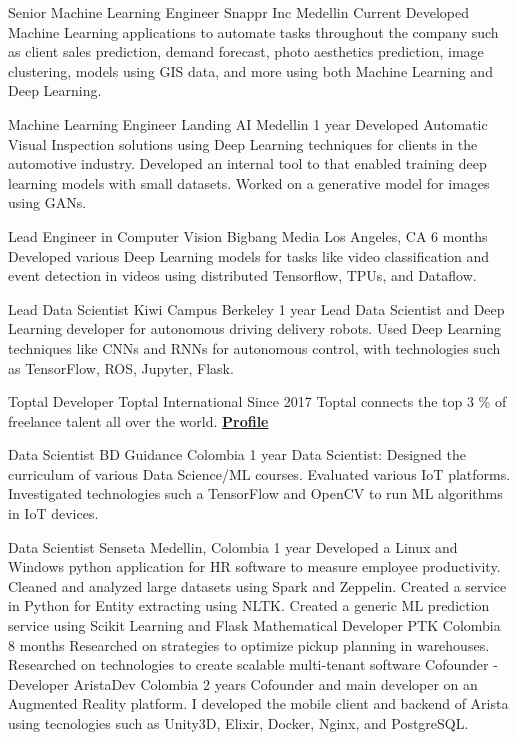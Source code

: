 \begin{cventries}

  \cventry
    {Senior Machine Learning Engineer}
    {Snappr Inc}
    {Medellin}
    {Current}
    {
    Developed Machine Learning applications to automate tasks throughout the company such as client sales prediction, demand forecast, photo aesthetics prediction, image clustering, models using GIS data, and more using both Machine Learning and Deep Learning.
    }

  \cventry
    {Machine Learning Engineer}
    {Landing AI}
    {Medellin}
    {1 year}
    {
    Developed Automatic Visual Inspection solutions using Deep Learning techniques for clients in the automotive industry. Developed an internal tool to that enabled training deep learning models with small datasets. Worked on a generative model for images using GANs.
    }

  \cventry
    {Lead Engineer in Computer Vision}
    {Bigbang Media}
    {Los Angeles, CA}
    {6 months}
    {
    Developed various Deep Learning models for tasks like video classification and event detection in videos using distributed Tensorflow, TPUs, and Dataflow.
    }
  
  \cventry
    {Lead Data Scientist}
    {Kiwi Campus}
    {Berkeley}
    {1 year}
    {
    Lead Data Scientist and Deep Learning developer for autonomous driving delivery robots. Used
    Deep Learning techniques like CNNs and RNNs for autonomous control,
    with technologies such as TensorFlow, ROS, Jupyter, Flask.
    }


  \cventry
    {Toptal Developer}
    {Toptal}
    {International}
    {Since 2017}
    {
      Toptal connects the top 3 \% of freelance talent all over the world. \href{https://www.toptal.com/resume/cristian-garcia}{\textbf{Profile}}
    }

  \cventry
    {Data Scientist}
    {BD Guidance}
    {Colombia}
    {1 year}
    {
    Data Scientist: Designed the curriculum of various
    Data Science/ML courses. Evaluated various IoT platforms. Investigated
    technologies such a TensorFlow and OpenCV to run ML algorithms in IoT
    devices.
    }

  \cventry
    {Data Scientist}
    {Senseta}
    {Medellin, Colombia}
    {1 year}
    {
    Developed a Linux and Windows python
    application for HR software to measure employee productivity. Cleaned
    and analyzed large datasets using Spark and Zeppelin. Created a service in
    Python for Entity extracting using NLTK. Created a generic ML prediction
    service using Scikit Learning and Flask
    }
  \cventry
    {Mathematical Developer}
    {PTK}
    {Colombia}
    {8 months}
    {
    Researched on strategies to optimize
    pickup planning in warehouses. Researched on technologies to create
    scalable multi-tenant software
    }
  \cventry
    {Cofounder - Developer}
    {AristaDev}
    {Colombia}
    {2 years}
    {
    Cofounder and main developer on an
    Augmented Reality platform. I developed the mobile client and backend
    of Arista using tecnologies such as Unity3D, Elixir, Docker, Nginx, and
    PostgreSQL.
    }
\end{cventries}
